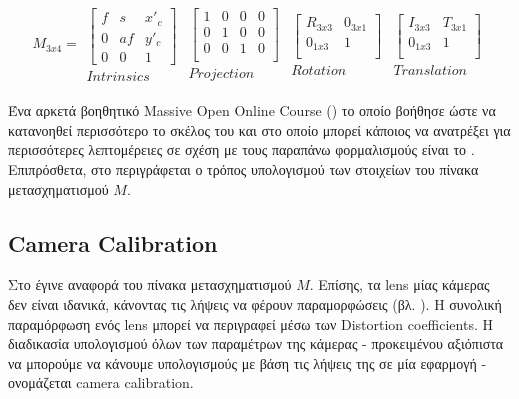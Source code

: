 \begin{gather}
	M_{3x4} = 
    \begin{matrix}
        \begin{bmatrix} 
            f & s & x'_c \\ 
            0 & af & y'_c \\
            0  & 0 & 1
        \end{bmatrix}\\
        Intrinsics
    \end{matrix}
    \begin{matrix}
        \begin{bmatrix} 
            1 & 0 & 0 & 0 \\ 
            0 & 1 & 0 & 0 \\ 
            0 & 0 & 1 & 0 \\ 
        \end{bmatrix}\\
        Projection
    \end{matrix}
    \begin{matrix}
        \begin{bmatrix} 
            R_{3x3} & 0_{3x1} \\ 
            0_{1x3} & 1 \\  
        \end{bmatrix}\\
        Rotation
    \end{matrix}
    \begin{matrix}
        \begin{bmatrix} 
            I_{3x3} & T_{3x1} \\ 
            0_{1x3} & 1 \\  
        \end{bmatrix}\\
        Translation
    \end{matrix} \label{eq:world-to-image-matrix}
\end{gather}

Ένα αρκετά βοηθητικό Massive Open Online Course () το οποίο βοήθησε ώστε να κατανοηθεί περισσότερο το σκέλος του  και στο οποίο μπορεί κάποιος να ανατρέξει για περισσότερες λεπτομέρειες σε σχέση με τους παραπάνω φορμαλισμούς είναι το \cite{introduction-to-computer-vision}. Επιπρόσθετα, στο  περιγράφεται ο τρόπος υπολογισμού των στοιχείων του πίνακα μετασχηματισμού $M$.

\subsection{Camera Calibration} \label{sec:camera-calibration}
Στο  έγινε αναφορά του πίνακα μετασχηματισμού $M$. Επίσης, τα lens μίας κάμερας δεν είναι ιδανικά, κάνοντας τις λήψεις να φέρουν παραμορφώσεις (βλ. ). Η συνολική παραμόρφωση ενός lens μπορεί να περιγραφεί μέσω των Distortion coefficients. Η διαδικασία υπολογισμού όλων των παραμέτρων της κάμερας - προκειμένου αξιόπιστα να μπορούμε να κάνουμε υπολογισμούς με βάση τις λήψεις της σε μία  εφαρμογή - ονομάζεται camera calibration. 


